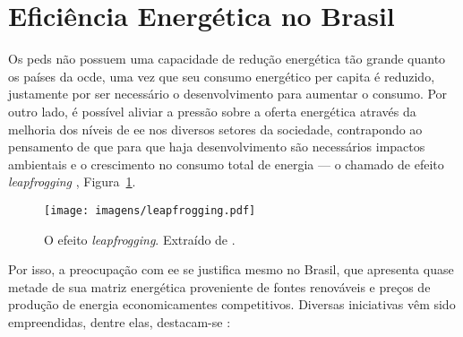 \section{Eficiência Energética no Brasil}
\label{sec:ee_brasil}

Os \glspl{ped} não possuem uma capacidade de redução energética tão grande
quanto os países da \gls{ocde}, uma vez que seu consumo energético per capita é
reduzido, justamente por ser necessário o desenvolvimento para aumentar o
consumo. Por outro lado, é possível aliviar a pressão sobre a
oferta energética através da melhoria dos níveis de \gls{ee} nos
diversos setores da sociedade, contrapondo ao pensamento de que para que
haja desenvolvimento são necessários impactos ambientais e o crescimento no
consumo total de energia --- o chamado de efeito \emph{leapfrogging}
\cite{goldemberg}, Figura~\ref{fig:leapfrogging}. 

\begin{figure}[h!t]
\centering
\texttt{[image: imagens/leapfrogging.pdf]}
\caption[O efeito \emph{leapfrogging}.]
{O efeito \emph{leapfrogging}. Extraído de \cite{goldemberg}.}
\label{fig:leapfrogging}
\end{figure}

Por isso, a preocupação com \gls{ee} se justifica mesmo no Brasil, 
que apresenta quase metade de sua matriz energética proveniente de fontes 
renováveis e preços de produção de energia economicamentes competitivos.
Diversas iniciativas vêm sido empreendidas, dentre elas, destacam-se
\cite{pnef,pne30_eff_energ,epe_demanda_2012,epe_slides_eficiencia}:


